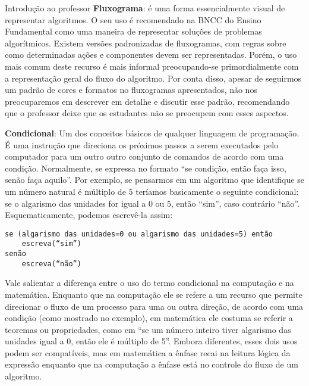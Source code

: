 \begin{apresentacao}{Introdução ao professor}
\textbf{Fluxograma}: é uma forma essencialmente visual de representar algoritmos. O seu uso é recomendado na BNCC do Ensino Fundamental como uma maneira de representar soluções de problemas algorítmicos. Existem versões padronizadas de fluxogramas, com regras sobre como determinadas ações e componentes devem ser representadas. Porém, o uso mais comum deste recurso é mais informal preocupando-se primordialmente com a representação geral do fluxo do algoritmo. Por conta disso, apesar de seguirmos um padrão de cores e formatos no fluxogramas apresentados, não nos preocuparemos em descrever em detalhe e discutir esse padrão, recomendando que o professor deixe que os estudantes não se preocupem com esses aspectos.

\textbf{Condicional}: Um dos conceitos básicos de qualquer linguagem de programação. É uma instrução que direciona os próximos passos a serem executados pelo computador para um outro outro conjunto de comandos de acordo com uma condição. Normalmente, se expressa no formato “se condição, então faça isso, senão faça aquilo”. Por exemplo, se pensarmos em um algoritmo que identifique se um número natural é múltiplo de $5$ teríamos basicamente o seguinte condicional: se o algarismo das unidades for igual a $0$ ou $5$, então “sim”, caso contrário “não”. Esquematicamente, podemos escrevê-la assim:

\begin{verbatim}
se (algarismo das unidades=0 ou algarismo das unidades=5) então
    escreva(“sim”)
senão
    escreva(“não”)
\end{verbatim}

Vale salientar a diferença entre o uso do termo condicional na computação e na matemática. Enquanto que na computação ele se refere a um recurso que permite direcionar o fluxo de um processo para uma ou outra direção, de acordo com uma condição (como mostrado no exemplo), em matemática ele costuma se referir a teoremas ou propriedades, como em “se um número inteiro tiver algarismo das unidades igual a $0$, então ele é múltiplo de 5”. Embora diferentes, esses dois usos podem ser compatíveis, mas em matemática a ênfase recai na leitura lógica da expressão enquanto que na computação a ênfase está no controle do fluxo de um algoritmo.


\end{apresentacao}
